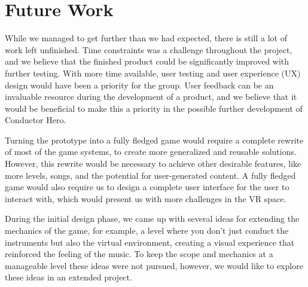 \chapter{Future Work}

While we managed to get further than we had expected, there is still a lot of work left unfinished. Time constraints was a challenge throughout the project, and we believe that the finished product could be significantly improved with further testing. With more time available, user testing and user experience (UX) design would have been a priority for the group.  User feedback can be an invaluable resource during the development of a product, and we believe that it would be beneficial to make this a priority in the possible further development of Conductor Hero. 

Turning the prototype into a fully fledged game would require a complete rewrite of most of the game systems, to create more generalized and reusable solutions. However, this rewrite would be necessary to achieve other desirable features, like more levels, songs, and the potential for user-generated content. A fully fledged game would also require us to design a complete user interface for the user to interact with, which would present us with more challenges in the VR space. 

During the initial design phase, we came up with several ideas for extending the mechanics of the game, for example, a level where you don’t just conduct the instruments but also the virtual environment, creating a visual experience that reinforced the feeling of the music. To keep the scope and mechanics at a manageable level these ideas were not pursued, however, we would like to explore these ideas in an extended project.
